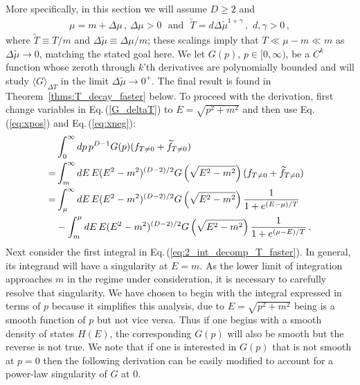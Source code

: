 \documentclass[sn-mathphys,Numbered]{sn-jnl}
\newcommand{\req}[1]{Eq.\,(\ref{#1})}
\newcommand{\rTh}[1]{Theorem~{\ref{#1}}}
\begin{document}
More specifically, in this section we will assume $D\geq 2$ and
\begin{align}\label{eq:T_mu_relation}
 \mu=m+\Delta\mu\,, \,\Delta\mu>0 \,\, \text{ and } \,\, \widetilde{T}=d\Delta\widetilde{\mu}^{1+\gamma}\,, \,\,d,\gamma>0\,,
\end{align}
where $\widetilde{T}\equiv T/m$ and $\Delta\widetilde{\mu}\equiv \Delta\mu/m$; these scalings imply that $T\ll\mu-m\ll m$ as $\Delta\widetilde{\mu}\to 0$, matching the stated goal here. We let $G(p)$, $p\in[0,\infty)$, be a $C^k$ function whose zeroth through $k$'th derivatives are polynomially bounded and will study $\langle G\rangle_{\Delta T}$ in the limit $\Delta\widetilde{\mu}\to 0^+$. The final result is found in \rTh{thms:T_decay_faster} below. To proceed with the derivation, first change variables in \req{G_deltaT} to $E=\sqrt{p^2+m^2}$ and then use \req{eq:xpos} and \req{eq:xneg}:
\begin{align}
 &\int_0^\infty dp\, p^{D-1} G(p)(f_{T\neq 0}+\widetilde{f}_{T\neq 0})\notag\\
 =&\int_m^\infty dE \,E(E^2-m^2)^{(D-2)/2} G\left(\sqrt{E^2-m^2}\right)(f_{T\neq 0}+\widetilde{f}_{T\neq 0})\notag\\
 =&\int_{\mu}^\infty dE\, E(E^2-m^2)^{(D-2)/2} G\left(\sqrt{E^2-m^2}\right)
 \frac{1}{1+e^{(E-\mu)/T}}\label{eq:2_int_decomp_T_faster} \\
 &-\int_m^{\mu} dE \,E(E^2-m^2)^{(D-2)/2} G\left(\sqrt{E^2-m^2}\right)\frac{1}{1+e^{(\mu-E)/T}} \,.\notag
\end{align}
Next consider the first integral in \req{eq:2_int_decomp_T_faster}. In general, its integrand will have a singularity at $E=m$. As the lower limit of integration approaches $m$ in the regime under consideration, it is necessary to carefully resolve that singularity. We have chosen to begin with the integral expressed in terms of $p$ because it simplifies this analysis, due to $E=\sqrt{p^2+m^2}$ being is a smooth function of $p$ but not vice versa. Thus if one begins with a smooth density of states $H(E)$, the corresponding $G(p)$ will also be smooth but the reverse is not true. We note that if one is interested in $G(p)$ that is not smooth at $p=0$ then the following derivation can be easily modified to account for a power-law singularity of $G$ at $0$.
\end{document}
